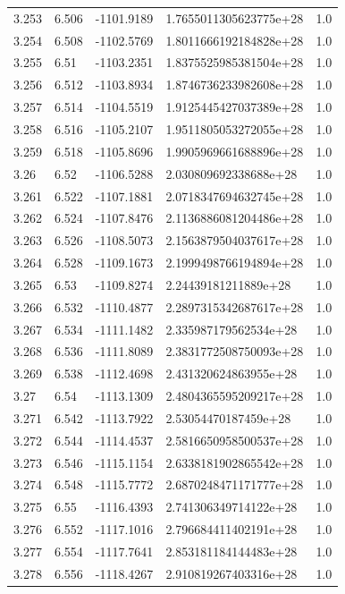 \begin{tabular}{lllll}
3.253 & 6.506 & -1101.9189 & 1.7655011305623775e+28 & 1.0 \\
3.254 & 6.508 & -1102.5769 & 1.8011666192184828e+28 & 1.0 \\
3.255 & 6.51 & -1103.2351 & 1.8375525985381504e+28 & 1.0 \\
3.256 & 6.512 & -1103.8934 & 1.8746736233982608e+28 & 1.0 \\
3.257 & 6.514 & -1104.5519 & 1.9125445427037389e+28 & 1.0 \\
3.258 & 6.516 & -1105.2107 & 1.9511805053272055e+28 & 1.0 \\
3.259 & 6.518 & -1105.8696 & 1.9905969661688896e+28 & 1.0 \\
3.26 & 6.52 & -1106.5288 & 2.030809692338688e+28 & 1.0 \\
3.261 & 6.522 & -1107.1881 & 2.0718347694632745e+28 & 1.0 \\
3.262 & 6.524 & -1107.8476 & 2.1136886081204486e+28 & 1.0 \\
3.263 & 6.526 & -1108.5073 & 2.1563879504037617e+28 & 1.0 \\
3.264 & 6.528 & -1109.1673 & 2.1999498766194894e+28 & 1.0 \\
3.265 & 6.53 & -1109.8274 & 2.24439181211889e+28 & 1.0 \\
3.266 & 6.532 & -1110.4877 & 2.2897315342687617e+28 & 1.0 \\
3.267 & 6.534 & -1111.1482 & 2.335987179562534e+28 & 1.0 \\
3.268 & 6.536 & -1111.8089 & 2.3831772508750093e+28 & 1.0 \\
3.269 & 6.538 & -1112.4698 & 2.431320624863955e+28 & 1.0 \\
3.27 & 6.54 & -1113.1309 & 2.4804365595209217e+28 & 1.0 \\
3.271 & 6.542 & -1113.7922 & 2.53054470187459e+28 & 1.0 \\
3.272 & 6.544 & -1114.4537 & 2.5816650958500537e+28 & 1.0 \\
3.273 & 6.546 & -1115.1154 & 2.6338181902865542e+28 & 1.0 \\
3.274 & 6.548 & -1115.7772 & 2.6870248471171777e+28 & 1.0 \\
3.275 & 6.55 & -1116.4393 & 2.741306349714122e+28 & 1.0 \\
3.276 & 6.552 & -1117.1016 & 2.796684411402191e+28 & 1.0 \\
3.277 & 6.554 & -1117.7641 & 2.853181184144483e+28 & 1.0 \\
3.278 & 6.556 & -1118.4267 & 2.910819267403316e+28 & 1.0 \\

\end{tabular}
